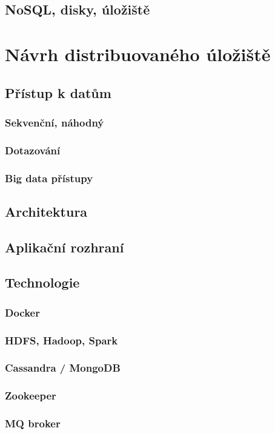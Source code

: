 \section{NoSQL, disky, úložiště}

\chapter{Návrh distribuovaného úložiště}
\section{Přístup k datům}
\subsection{Sekvenční, náhodný}
\subsection{Dotazování}
\subsection{Big data přístupy}
\section{Architektura}
\section{Aplikační rozhraní}
\section{Technologie}
\subsection{Docker}
\subsection{HDFS, Hadoop, Spark}
\subsection{Cassandra / MongoDB}
\subsection{Zookeeper}
\subsection{MQ broker}

